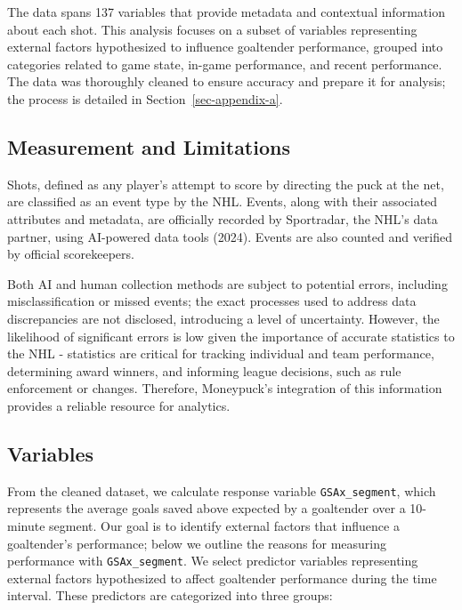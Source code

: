 \documentclass[
  letterpaper,
  DIV=11,
  numbers=noendperiod]{scrartcl}
\begin{document}
The data spans 137 variables that provide metadata and contextual
information about each shot. This analysis focuses on a subset of
variables representing external factors hypothesized to influence
goaltender performance, grouped into categories related to game state,
in-game performance, and recent performance. The data was thoroughly
cleaned to ensure accuracy and prepare it for analysis; the process is
detailed in Section~\ref{sec-appendix-a}.

\subsection{Measurement and Limitations}\label{sec-measurement}

Shots, defined as any player's attempt to score by directing the puck at
the net, are classified as an event type by the NHL. Events, along with
their associated attributes and metadata, are officially recorded by
Sportradar, the NHL's data partner, using AI-powered data tools (2024).
Events are also counted and verified by official scorekeepers.

Both AI and human collection methods are subject to potential errors,
including misclassification or missed events; the exact processes used
to address data discrepancies are not disclosed, introducing a level of
uncertainty. However, the likelihood of significant errors is low given
the importance of accurate statistics to the NHL - statistics are
critical for tracking individual and team performance, determining award
winners, and informing league decisions, such as rule enforcement or
changes. Therefore, Moneypuck's integration of this information provides
a reliable resource for analytics.

\subsection{Variables}\label{sec-variables}

From the cleaned dataset, we calculate response variable
\texttt{GSAx\_segment}, which represents the average goals saved above
expected by a goaltender over a 10-minute segment. Our goal is to
identify external factors that influence a goaltender's performance;
below we outline the reasons for measuring performance with
\texttt{GSAx\_segment}. We select predictor variables representing
external factors hypothesized to affect goaltender performance during
the time interval. These predictors are categorized into three groups:
\end{document}

